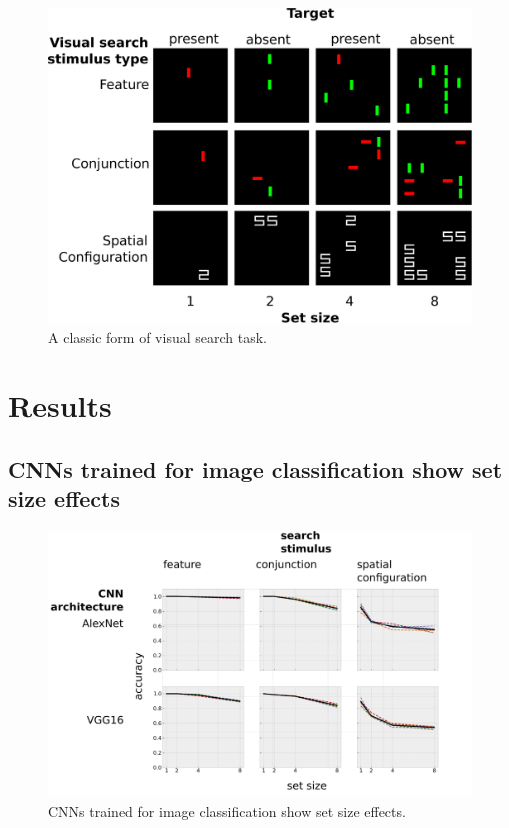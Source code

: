 \documentclass[10pt,letterpaper]{article}
\begin{document}
\begin{figure}[ht]
\begin{center}
\includegraphics[width=\columnwidth]{fig1/fig1.eps}
\end{center}
\caption{A classic form of visual search task.} 
\label{fig1}
\end{figure}



\section{Results}

\subsection{CNNs trained for image classification show set size effects}

\begin{figure}[ht]
\begin{center}
\includegraphics[width=\columnwidth]{fig2/fig2.png}
\end{center}
\caption{CNNs trained for image classification show set size effects.} 
\label{sample-figure}
\end{figure}
\end{document}

